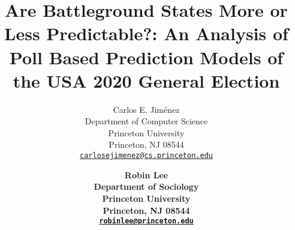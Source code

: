 \title{Are Battleground States More or Less Predictable?: An Analysis of Poll Based Prediction Models of the USA 2020 General Election}


\author{
	Carlos E. Jiménez\\
	Department of Computer Science\\
    Princeton University\\
    Princeton, NJ 08544\\
	\href{mailto:carlosej@princeton.edu}{\texttt{carlosejimenez@cs.princeton.edu}} \\
	\and
	\bf{Robin Lee} \\
	Department of Sociology\\
    Princeton University\\
    Princeton, NJ 08544\\
	\href{mailto:robinlee@princeton.edu}{\texttt{robinlee@princeton.edu}}
}


\renewcommand{\headeright}{}
\renewcommand{\undertitle}{}

